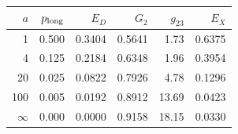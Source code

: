 \begin{tabular}{rrrrrr}
\toprule
$a$ & $p_{\rm long}$ & $E_D$ & $G_2$ & $g_{23}$ & $E_X$ \\
\midrule
1 & 0.500 & 0.3404 & 0.5641 & 1.73 & 0.6375 \\
4 & 0.125 & 0.2184 & 0.6348 & 1.96 & 0.3954 \\
20 & 0.025 & 0.0822 & 0.7926 & 4.78 & 0.1296 \\
100 & 0.005 & 0.0192 & 0.8912 & 13.69 & 0.0423 \\
$\infty$ & 0.000 & 0.0000 & 0.9158 & 18.15 & 0.0330 \\
\bottomrule
\end{tabular}
